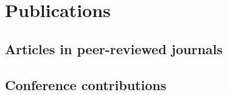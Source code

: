 \chapter*{Publications}

\noindent
\section*{Articles in peer-reviewed journals}
\begin{refsection}[ownpubs]
  \small%
  \nocite{*}
  \printbibliography[heading=none,type=article]
\end{refsection}

\noindent
\section*{Conference contributions}
\begin{refsection}[ownpubs]
  \small%
  \nocite{*}
  \printbibliography[heading=none,type=inproceedings]
\end{refsection}
